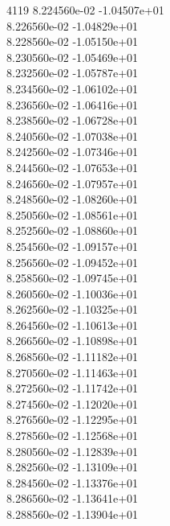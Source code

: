 4119	8.224560e-02	-1.04507e+01	\\ 	8.226560e-02	-1.04829e+01	\\ 	8.228560e-02	-1.05150e+01	\\ 	8.230560e-02	-1.05469e+01	\\ 	8.232560e-02	-1.05787e+01	\\ 	8.234560e-02	-1.06102e+01	\\ 	8.236560e-02	-1.06416e+01	\\ 	8.238560e-02	-1.06728e+01	\\ 	8.240560e-02	-1.07038e+01	\\ 	8.242560e-02	-1.07346e+01	\\ 	8.244560e-02	-1.07653e+01	\\ 	8.246560e-02	-1.07957e+01	\\ 	8.248560e-02	-1.08260e+01	\\ 	8.250560e-02	-1.08561e+01	\\ 	8.252560e-02	-1.08860e+01	\\ 	8.254560e-02	-1.09157e+01	\\ 	8.256560e-02	-1.09452e+01	\\ 	8.258560e-02	-1.09745e+01	\\ 	8.260560e-02	-1.10036e+01	\\ 	8.262560e-02	-1.10325e+01	\\ 	8.264560e-02	-1.10613e+01	\\ 	8.266560e-02	-1.10898e+01	\\ 	8.268560e-02	-1.11182e+01	\\ 	8.270560e-02	-1.11463e+01	\\ 	8.272560e-02	-1.11742e+01	\\ 	8.274560e-02	-1.12020e+01	\\ 	8.276560e-02	-1.12295e+01	\\ 	8.278560e-02	-1.12568e+01	\\ 	8.280560e-02	-1.12839e+01	\\ 	8.282560e-02	-1.13109e+01	\\ 	8.284560e-02	-1.13376e+01	\\ 	8.286560e-02	-1.13641e+01	\\ 	8.288560e-02	-1.13904e+01	\\ \hline
